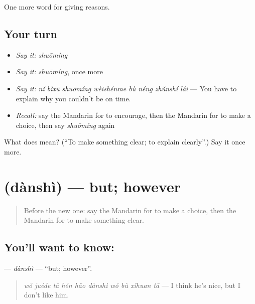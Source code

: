 \begin{grammarlens}[title={What you've built}]
One more word for giving reasons.
\end{grammarlens}

\subsection*{Your turn}
\begin{itemize}
\raggedright
  \item \emph{Say it:} \emph{shuōmíng}
  \item \emph{Say it:} \emph{shuōmíng}, once more
  \item \emph{Say it:} \emph{nǐ bìxū shuōmíng wèishénme bù néng zhǔnshí lái} — You have to explain why you couldn't be on time.
  \item \emph{Recall:} say the Mandarin for to encourage, then the Mandarin for to make a choice, then say \emph{shuōmíng} again
\end{itemize}

\begin{tcolorbox}[breakable,colback=teal!4,colframe=teal!35!black,title={Before you move on}]
What does  mean? (\textquotedblleft{}To make something clear; to explain clearly\textquotedblright{}.) Say it once more.
\end{tcolorbox}
\section[\texorpdfstring{\zh{但是} (dànshì)}{但是 (dànshì)}]{ (dànshì) — but; however}

\label{lesson:ZH-C369-danshi}



\begin{quote}
Before the new one: say the Mandarin for to make a choice, then the Mandarin for to make something clear.
\end{quote}

\subsection*{You'll want to know: }
\textbf{} — \emph{dànshì} — \textquotedblleft{}but; however\textquotedblright{}.

\begin{quote}
\textbf{} \emph{wǒ juéde tā hěn hǎo dànshì wǒ bù xǐhuan tā} — I think he's nice, but I don't like him.
\end{quote}

